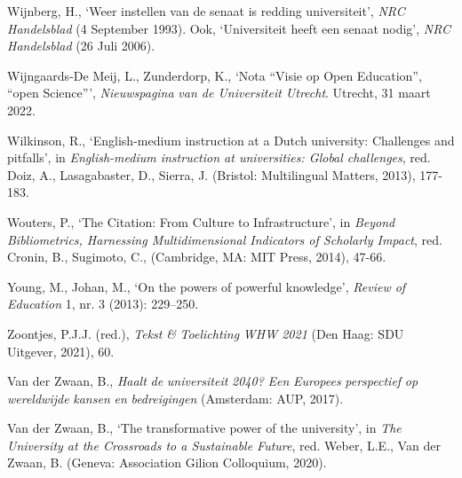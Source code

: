 \documentclass[smallauthor, chapterhaspagenum, nochapterinheader, pagenuminheader,  bigchapnum,medium2, tocpages, garamond, titleinheader]{jote-book}
\begin{document}
\begin{references}
		Wijnberg, H., ‘Weer instellen van de senaat is redding universiteit', \emph{NRC }\emph{Handelsblad} (4 September 1993). Ook, ‘Universiteit heeft een senaat nodig', \emph{NRC }\emph{Handelsblad} (26 Juli 2006).



		Wijngaards-De Meij, L., Zunderdorp, K., ‘Nota “Visie op Open Education”, “open Science”', \emph{Nieuwspagina}\emph{ van de Universiteit Utrecht}. Utrecht, 31 maart 2022.



		Wilkinson, R., ‘English-medium instruction at a Dutch university: Challenges and pitfalls', in \emph{English-medium instruction at universities: Global challenges}, red. Doiz, A., Lasagabaster, D., Sierra, J. (Bristol: Multilingual Matters, 2013), 177-183.



		Wouters, P., ‘The Citation: From Culture to Infrastructure', in \emph{Beyond Bibliometrics, Harnessing Multidimensional Indicators of Scholarly Impact}, red. Cronin, B., Sugimoto, C., (Cambridge, MA: MIT Press, 2014), 47-66.



		Young, M., Johan, M., ‘On the powers of powerful knowledge', \emph{Review of Education} 1, nr. 3 (2013): 229--250.



		Zoontjes, P.J.J. (red.), \emph{Tekst}\emph{ \& }\emph{Toelichting}\emph{ WHW 2021} (Den Haag: SDU Uitgever, 2021), 60.



		Van der Zwaan, B., \emph{Haalt}\emph{ de }\emph{universiteit}\emph{ 2040? }\emph{Een}\emph{ }\emph{Europees}\emph{ }\emph{perspectief}\emph{ op }\emph{wereldwijde}\emph{ }\emph{kansen}\emph{ }\emph{en}\emph{ }\emph{bedreigingen} (Amsterdam: AUP, 2017).



		Van der Zwaan, B., ‘The transformative power of the university', in\emph{ The University at the Crossroads to a Sustainable Future}, red. Weber, L.E., Van der Zwaan, B. (Geneva: Association Gilion Colloquium, 2020).


	\end{references}











	\printindex
\end{document}
